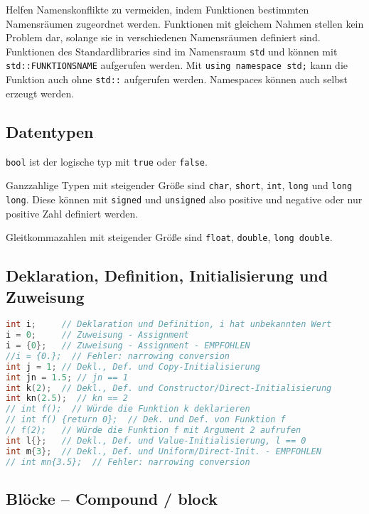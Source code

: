 \documentclass[10pt,twocolumn]{scrartcl}
\begin{document}
Helfen Namenskonflikte zu vermeiden, indem Funktionen bestimmten Namensräumen
zugeordnet werden. Funktionen mit gleichem Nahmen stellen kein Problem dar,
solange sie in verschiedenen Namensräumen definiert sind. Funktionen des
Standardlibraries sind im Namensraum \lstinline|std| und können mit
\lstinline|std::FUNKTIONSNAME| aufgerufen werden. Mit
\lstinline|using namespace std;| kann die Funktion auch ohne \lstinline|std::|
aufgerufen werden. Namespaces können auch selbst erzeugt werden.

\subsection{Datentypen}

\lstinline|bool| ist der logische typ mit \lstinline|true| oder
\lstinline|false|.

Ganzzahlige Typen mit steigender Größe sind \lstinline|char|, \lstinline|short|,
\lstinline|int|, \lstinline|long| und \lstinline|long long|. Diese können mit
\lstinline|signed| und \lstinline|unsigned| also positive und negative oder nur
positive Zahl definiert werden.

Gleitkommazahlen mit steigender Größe sind \lstinline|float|,
\lstinline|double|, \lstinline|long double|.

\subsection{Deklaration, Definition, Initialisierung und Zuweisung}

\begin{lstlisting}[language=C++]
int i;     // Deklaration und Definition, i hat unbekannten Wert
i = 0;     // Zuweisung - Assignment
i = {0};   // Zuweisung - Assignment - EMPFOHLEN
//i = {0.};  // Fehler: narrowing conversion
int j = 1; // Dekl., Def. und Copy-Initialisierung
int jn = 1.5; // jn == 1
int k(2);  // Dekl., Def. und Constructor/Direct-Initialisierung
int kn(2.5);  // kn == 2
// int f();  // Würde die Funktion k deklarieren
// int f() {return 0};  // Dek. und Def. von Funktion f
// f(2);   // Würde die Funktion f mit Argument 2 aufrufen
int l{};   // Dekl., Def. und Value-Initialisierung, l == 0
int m{3};  // Dekl., Def. und Uniform/Direct-Init. - EMPFOHLEN
// int mn{3.5};  // Fehler: narrowing conversion
\end{lstlisting}

\subsection{Blöcke -- Compound / block}
\end{document}
